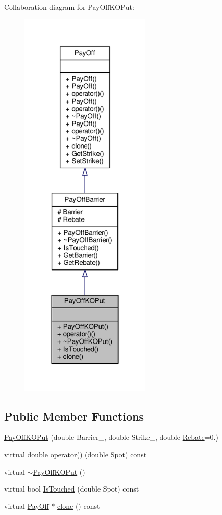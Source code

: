Collaboration diagram for Pay\+Off\+K\+O\+Put\+:
\nopagebreak
\begin{figure}[H]
\begin{center}
\leavevmode
\includegraphics[width=178pt]{classPayOffKOPut__coll__graph}
\end{center}
\end{figure}
\subsection*{Public Member Functions}
\begin{DoxyCompactItemize}
\item 
\hyperlink{classPayOffKOPut_afd98032ab799b0c9748220c488dd3ee2}{Pay\+Off\+K\+O\+Put} (double Barrier\+\_\+, double Strike\+\_\+, double \hyperlink{classPayOffBarrier_aca3ea631dcdb28a1df971b74774e41f8}{Rebate}=0.)
\item 
virtual double \hyperlink{classPayOffKOPut_af773c102b127b0d58091d37a1d8737a0}{operator()} (double Spot) const
\item 
virtual \hyperlink{classPayOffKOPut_a108561d7440c3af8677fd78e0254dea6}{$\sim$\+Pay\+Off\+K\+O\+Put} ()
\item 
virtual bool \hyperlink{classPayOffKOPut_ad3237bb8f95b93cb2930b5c2a57fd7f8}{Is\+Touched} (double Spot) const
\item 
virtual \hyperlink{classPayOff}{Pay\+Off} $\ast$ \hyperlink{classPayOffKOPut_a5d1bfbac10d0d7d061d8c629042d2a58}{clone} () const
\end{DoxyCompactItemize}
